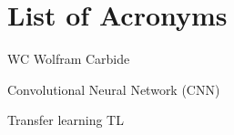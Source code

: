 \chapter*{List of Acronyms}

WC Wolfram Carbide

Convolutional Neural Network (CNN) 

Transfer learning TL